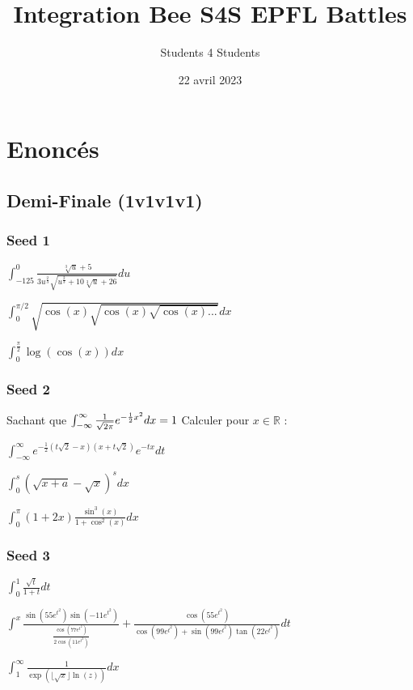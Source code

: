 \documentclass[11.5pt,french,table]{article}
\title{Integration Bee S4S EPFL Battles}
\author{Students 4 Students}
\date{22 avril 2023}
\theoremstyle{exercice}
\newcommand{\R}{\mathbb{R}}
\newenvironment{packed_enum}{
\begin{enumerate}
  \setlength{\itemsep}{11pt}
  \setlength{\parskip}{0pt}
  \setlength{\parsep}{0pt}
}{\end{enumerate}}
\newcommand{\R}{\mathbb{R}}
\begin{document}
\maketitle

\section{Enoncés}
\subsection{Demi-Finale (1v1v1v1)}

\subsubsection{Seed 1}
\begin{packed_enum}
    \item $\int_{-125}^{0} \frac{\sqrt[3]{u}+5}{3u^\frac{2}{3}\sqrt{u^\frac{2}{3}+10\sqrt[3]{u}+26}}du $

    \item $\int_0^{\pi/2}\sqrt{\cos(x)\sqrt{\cos(x)\sqrt{\cos(x)...}}}dx$

    \item $\int_0^\frac{\pi}{2}\log(\cos(x))dx$
\end{packed_enum}


\subsubsection{Seed 2}

\begin{packed_enum}
    \item Sachant que $\int_{-\infty}^\infty \frac{1}{\sqrt{2 \pi}} e^{-\frac{1}{2}x^2}dx = 1\\$
    Calculer pour  $x \in \R$ :
    
    $\int_{-\infty}^\infty e^{-\frac{1}{2}(t\sqrt{2}-x)(x+t\sqrt{2})}e^{-tx} dt$

    \item $\int_0^s (\sqrt{x+a} - \sqrt{x})^s dx$

    \item $\int_0^{\pi} (1+2x)\frac{\sin^3(x)}{1+\cos^2(x)}dx$
\end{packed_enum}


\subsubsection{Seed 3}
\begin{packed_enum}
    \item $\int_{0}^{1} \frac{\sqrt{t}}{1+t}dt$

    \item $
    \int_{}^{x} \frac{\sin(55e^{t^{2}})\sin(-11e^{t^{2}})}{\frac{\cos(77e^{t^{2}})}{2\cos(11e^{t^{2}})}} + \frac{\cos(55e^{t^{2}})}{\cos(99e^{t^2})+\sin(99e^{t^2})\tan(22e^{t^2})} dt
    $ 

    \item $
    \int_1^{\infty} \frac{1}{\exp\left(\lfloor \sqrt{x} \rfloor \ln(z)\right)}dx
    $
    
\end{packed_enum}
\end{document}
